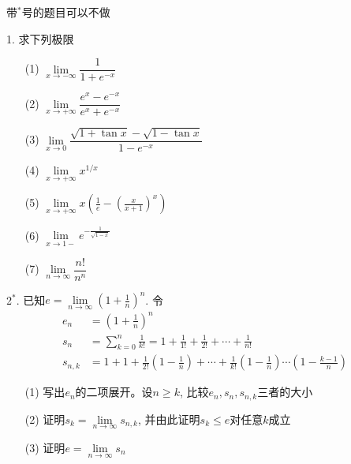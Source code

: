 \begin{frame}

{\color{red} \scriptsize 带$^*$号的题目可以不做}

\vspace{1em}

1. 求下列极限
\begin{itemize}
\item[(1)] $\lim\limits_{x\to-\infty} \dfrac{1}{1+e^{-x}}$
\item[(2)] $\lim\limits_{x\to+\infty} \dfrac{e^x-e^{-x}}{e^x+e^{-x}}$
\item[(3)] $\lim\limits_{x\to 0} \dfrac{\sqrt{1+\tan x} - \sqrt{1-\tan x}}{1-e^{-x}}$
\item[(4)] $\lim\limits_{x\to +\infty} x^{1/x}$
\item[(5)] $\lim\limits_{x\to +\infty} x\left( \frac{1}{e} - \left(\frac{x}{x+1}\right)^x \right)$
\item[(6)] $\lim\limits_{x\to 1-} e^{-\frac{1}{\sqrt{1-x}}}$
\item[(7)] $\lim\limits_{n\to \infty} \dfrac{n!}{n^n}$
\end{itemize}

\end{frame}


\begin{frame}

2$^*$. 已知$e = \lim\limits_{n\to\infty} \left(1+\frac{1}{n}\right)^n$. 令
\begin{align*}
e_n & = \left(1+\frac{1}{n}\right)^n \\
s_n & = \sum\limits_{k=0}^n \frac{1}{k!} = 1 + \frac{1}{1!} + \frac{1}{2!} + \cdots + \frac{1}{n!} \\
s_{n,k} & = 1 + 1 + \frac{1}{2!}\left( 1-\frac{1}{n} \right) + \cdots + \frac{1}{k!}\left( 1-\frac{1}{n} \right)\cdots \left( 1-\frac{k-1}{n} \right)
\end{align*}
\begin{itemize}
\item[(1)] 写出$e_n$的二项展开。设$n\ge k$, 比较$e_n,s_n,s_{n,k}$三者的大小
\item[(2)] 证明$s_k = \lim\limits_{n\to\infty} s_{n,k}$, 并由此证明$s_k\le e$对任意$k$成立
\item[(3)] 证明$e=\lim\limits_{n\to\infty} s_n$
\end{itemize}

\end{frame}

